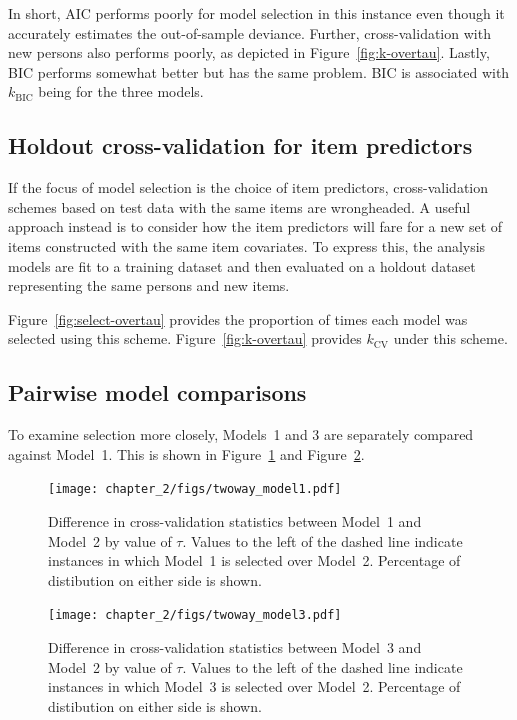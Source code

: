 \documentclass[12pt, letterpaper]{article}
\begin{document}
In short, AIC performs poorly for model selection in this instance even though it accurately estimates the out-of-sample deviance. Further, cross-validation with new persons also performs poorly, as depicted in Figure~\ref{fig:k-overtau}. Lastly, BIC performs somewhat better but has the same problem. BIC is associated with $k_\mathrm{BIC}$ being \bic[and] for the three models. 


\subsection{Holdout cross-validation for item predictors}

If the focus of model selection is the choice of item predictors, cross-validation schemes based on test data with the same items are wrongheaded. A useful approach instead is to consider how the item predictors will fare for a new set of items constructed with the same item covariates. To express this, the analysis models are fit to a training dataset and then evaluated on a holdout dataset representing the same persons and new items. 

Figure~\ref{fig:select-overtau} provides the proportion of times each model was selected using this scheme. 
Figure~\ref{fig:k-overtau} provides $k_\mathrm{CV}$ under this scheme.


\subsection{Pairwise model comparisons}

To examine selection more closely, Models~1 and 3 are separately compared against Model~1. This is shown in Figure~\ref{fig:pairwise-model1} and Figure~\ref{fig:pairwise-model3}.

\begin{figure}[tbp]
	\centering
	\texttt{[image: chapter\_2/figs/twoway\_model1.pdf]}
	\caption{Difference in cross-validation statistics between Model~1 and Model~2 by value of $\tau$. Values to the left of the dashed line indicate instances in which Model~1 is selected over Model~2. Percentage of distibution on either side is shown.}
	\label{fig:pairwise-model1}
\end{figure}

\begin{figure}[tbp]
	\centering
	\texttt{[image: chapter\_2/figs/twoway\_model3.pdf]}
	\caption{Difference in cross-validation statistics between Model~3 and Model~2 by value of $\tau$. Values to the left of the dashed line indicate instances in which Model~3 is selected over Model~2. Percentage of distibution on either side is shown.}
	\label{fig:pairwise-model3}
\end{figure}
\end{document}

